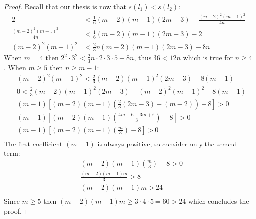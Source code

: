 \begin{proof}
	Recall that our thesis is now that $s(l_1)<s(l_2)$:
	\begin{align*}
		2 &< \frac{1}{6}(m-2)(m-1)(2m-3)-\frac{(m-2)^2(m-1)^2}{4n}\\
		\frac{(m-2)^2(m-1)^2}{4n} &< \frac{1}{6}(m-2)(m-1)(2m-3)-2 \\
		(m-2)^2(m-1)^2 &< \frac{2}{3}n(m-2)(m-1)(2m-3)-8n
	\end{align*} 
	When $m=4$ then $2^2 \cdot 3^2 < \frac{2}{3}n\cdot2 \cdot3\cdot5-8n$, thus $36<12n$ which is true for $n\geq4$.
	When $m\geq5$ then $n\geq m-1$:
	\begin{align*}
		&(m-2)^2(m-1)^2 < \frac{2}{3}(m-2)(m-1)^2(2m-3)-8(m-1)\\
		&0 < \frac{2}{3}(m-2)(m-1)^2(2m-3)-(m-2)^2(m-1)^2-8(m-1)\\
		&(m-1)[(m-2)(m-1)\left(\frac{2}{3}(2m-3)-(m-2)\right)-8]>0\\
		&(m-1)[(m-2)(m-1)\left(\frac{4m-6-3m+6}{3}\right)-8]>0\\
		&(m-1)[(m-2)(m-1)\left(\frac{m}{3}\right)-8]>0\\
	\end{align*}
	The first coefficient $(m-1)$ is always positive, so consider only the second term:
	\begin{align*}
		&(m-2)(m-1)\left(\frac{m}{3}\right)-8>0\\
		&\frac{(m-2)(m-1)m}{3}>8\\
		&(m-2)(m-1)m>24\\
	\end{align*}
	Since $m\geq5$ then $(m-2)(m-1)m\geq 3\cdot4\cdot5=60>24$ which concludes the proof.
\end{proof}

